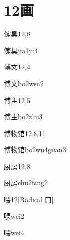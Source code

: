 
\section*{12画}

\begin{entry}{傢具}{12,8}
  \begin{phonetics}{傢具}{jia1ju4}
  \end{phonetics}
\end{entry}

\begin{entry}{博文}{12,4}
  \begin{phonetics}{博文}{bo2wen2}
  \end{phonetics}
\end{entry}

\begin{entry}{博主}{12,5}
  \begin{phonetics}{博主}{bo2zhu3}
  \end{phonetics}
\end{entry}

\begin{entry}{博物馆}{12,8,11}
  \begin{phonetics}{博物馆}{bo2wu4guan3}
  \end{phonetics}
\end{entry}

\begin{entry}{厨房}{12,8}
  \begin{phonetics}{厨房}{chu2fang2}
  \end{phonetics}
\end{entry}

\begin{entry}{喂}{12}[Radical 口]
  \begin{phonetics}{喂}{wei2}
  \end{phonetics}
  \begin{phonetics}{喂}{wei4}
  \end{phonetics}
\end{entry}

